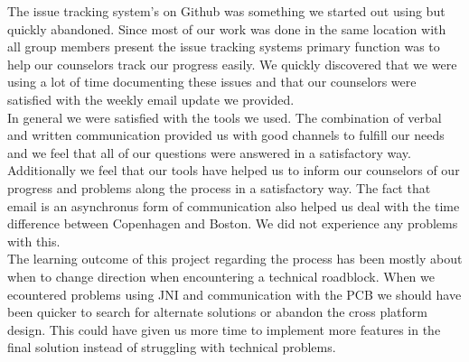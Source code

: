The issue tracking system's on Github was something we started out using but quickly abandoned. Since most of our work was done in the same location with all group members present the issue tracking systems primary function was to help our counselors track our progress easily. We quickly discovered that we were using a lot of time documenting these issues and that our counselors were satisfied with the weekly email update we provided. \\

In general we were satisfied with the tools we used. The combination of verbal and written communication provided us with good channels to fulfill our needs and we feel that all of our questions were answered in a satisfactory way. Additionally we feel that our tools have helped us to inform our counselors of our progress and problems along the process in a satisfactory way. The fact that email is an asynchronus form of communication also helped us deal with the time difference between Copenhagen and Boston. We did not experience any problems with this. \\

The learning outcome of this project regarding the process has been mostly about when to change direction when encountering a technical roadblock. When we ecountered problems using JNI and communication with the PCB we should have been quicker to search for alternate solutions or abandon the cross platform design. This could have given us more time to implement more features in the final solution instead of struggling with technical problems.